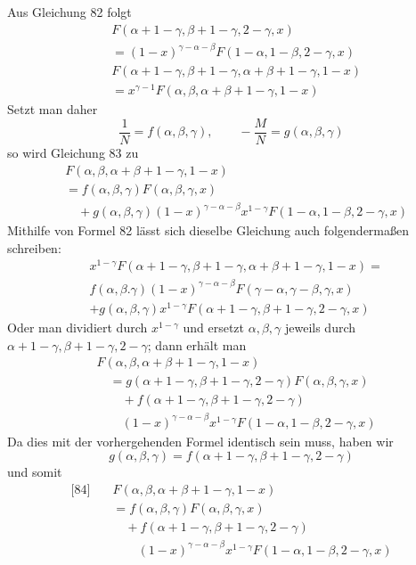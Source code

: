 
Aus Gleichung 82 folgt
\[
\begin{aligned}
&F(\alpha+1-\gamma,\beta+1-\gamma,2-\gamma,x)\\&=(1-x)^{\gamma-\alpha-\beta}F(1-\alpha,1-\beta,2-\gamma,x)\\[5pt]
&F(\alpha+1-\gamma,\beta+1-\gamma,\alpha+\beta+1-\gamma,1-x)\\&=x^{\gamma-1}F(\alpha,\beta,\alpha+\beta+1-\gamma,1-x)
\end{aligned}
\]
Setzt man daher
\[
\frac{1}{N}=f(\alpha,\beta,\gamma),\qquad-\frac{M}{N}=g(\alpha,\beta,\gamma)
\]
so wird Gleichung 83 zu
\[
\begin{aligned}
&F(\alpha,\beta,\alpha+\beta+1-\gamma,1-x)\\&=f(\alpha,\beta,\gamma)F(\alpha,\beta,\gamma,x)\\
&\quad+g(\alpha,\beta,\gamma)(1-x)^{\gamma-\alpha-\beta}x^{1-\gamma}F(1-\alpha,1-\beta,2-\gamma,x)
\end{aligned}
\]
Mithilfe von Formel 82 lässt sich dieselbe Gleichung auch folgendermaßen schreiben:
\[
\begin{aligned}
&x^{1-\gamma}F(\alpha+1-\gamma,\beta+1-\gamma,\alpha+\beta+1-\gamma,1-x)=\\
&f(\alpha,\beta.\gamma)(1-x)^{\gamma-\alpha-\beta}F(\gamma-\alpha,\gamma-\beta,\gamma,x)
\\&+g(\alpha,\beta,\gamma)x^{1-\gamma}F(\alpha+1-\gamma,\beta+1-\gamma,2-\gamma,x)
\end{aligned}
\]
Oder man dividiert durch \(x^{1-\gamma}\) und ersetzt \(\alpha,\beta,\gamma\) jeweils durch \(\alpha+1-\gamma,\beta+1-\gamma,2-\gamma\); dann erhält man
\[
\begin{aligned}
&F(\alpha,\beta,\alpha+\beta+1-\gamma,1-x)\\
&\quad=g(\alpha+1-\gamma,\beta+1-\gamma,2-\gamma)F(\alpha,\beta,\gamma,x)\\
&\qquad+f(\alpha+1-\gamma,\beta+1-\gamma,2-\gamma)\\&\qquad(1-x)^{\gamma-\alpha-\beta}x^{1-\gamma}F(1-\alpha,1-\beta,2-\gamma,x)
\end{aligned}
\]
Da dies mit der vorhergehenden Formel identisch sein muss, haben wir
\[
g(\alpha,\beta,\gamma)=f(\alpha+1-\gamma,\beta+1-\gamma,2-\gamma)
\]
und somit
\[
\begin{aligned}
\text{[84]}\quad &F(\alpha,\beta,\alpha+\beta+1-\gamma,1-x)\\
&=f(\alpha,\beta,\gamma)F(\alpha,\beta,\gamma,x)\\
&\quad+f(\alpha+1-\gamma,\beta+1-\gamma,2-\gamma)\\&\qquad(1-x)^{\gamma-\alpha-\beta}x^{1-\gamma}F(1-\alpha,1-\beta,2-\gamma,x)
\end{aligned}
\]
